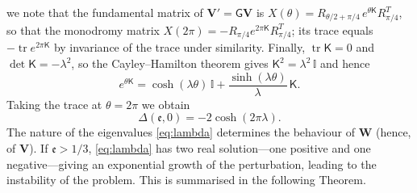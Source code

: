 \documentclass[reqno]{amsart}
\newcommand{\Msf}{\mathsf{G}}
\newcommand{\ee}{\mathfrak{e}}
\newcommand{\tr}{\operatorname{tr}}     %
\begin{document}
we note that the fundamental matrix of $\mathbf V'=\Msf\mathbf V$ is $X(\theta)=R_{\theta/2+\pi/4}\,e^{\theta\mathsf K}R_{\pi/4}^T$, so that the monodromy matrix $X(2\pi)=-R_{\pi/4}e^{2\pi\mathsf K}R_{\pi/4}^T$; its trace equals $-\tr e^{2\pi\mathsf K}$ by invariance of the trace under similarity. Finally, $\tr\mathsf K=0$ and $\det\mathsf K=-\lambda^2$, so the Cayley--Hamilton theorem gives $\mathsf K^2=\lambda^2\,\mathbb I$ and hence
\[
e^{\theta\mathsf K}=\cosh(\lambda\theta)\,\mathbb I+\frac{\sinh(\lambda\theta)}{\lambda}\,\mathsf K.
\]
Taking the trace at $\theta=2\pi$ we obtain
\begin{equation}\label{eq:Delta0}
\Delta(\ee,0)=-2\cosh(2\pi\lambda).
\end{equation}
The nature of the eigenvalues \eqref{eq:lambda} determines the behaviour of $\mathbf{W}$ (hence, of $\mathbf{V}$). If $\ee>1/3$, \eqref{eq:lambda} has two real solution---one positive and one negative---giving an exponential growth of the perturbation, leading to the instability of the problem. This is summarised in the following Theorem.
\end{document}
